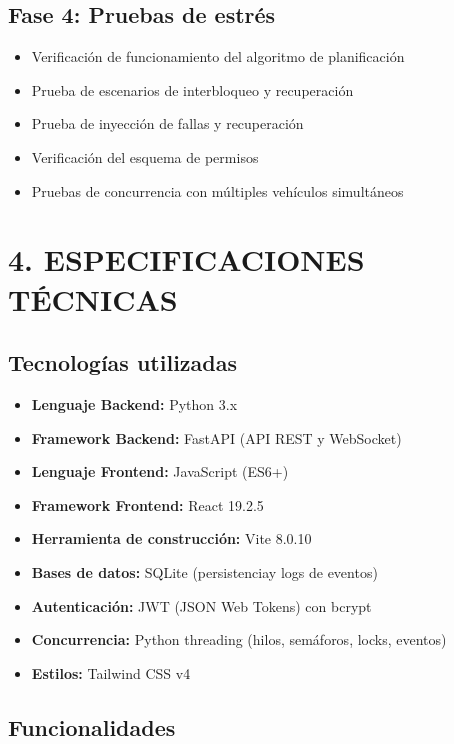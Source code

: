 \documentclass[12pt,a4paper]{article}
\begin{document}
\subsection{Fase 4: Pruebas de estrés}
\begin{itemize}
    \item Verificación de funcionamiento del algoritmo de planificación
    \item Prueba de escenarios de interbloqueo y recuperación
    \item Prueba de inyección de fallas y recuperación
    \item Verificación del esquema de permisos
    \item Pruebas de concurrencia con múltiples vehículos simultáneos
\end{itemize}

\newpage

\section{4. ESPECIFICACIONES TÉCNICAS}

\subsection{Tecnologías utilizadas}

\begin{itemize}
    \item \textbf{Lenguaje Backend:} Python 3.x
    \item \textbf{Framework Backend:} FastAPI (API REST y WebSocket)
    \item \textbf{Lenguaje Frontend:} JavaScript (ES6+)
    \item \textbf{Framework Frontend:} React 19.2.5
    \item \textbf{Herramienta de construcción:} Vite 8.0.10
    \item \textbf{Bases de datos:} SQLite (persistenciay logs de eventos)
    \item \textbf{Autenticación:} JWT (JSON Web Tokens) con bcrypt
    \item \textbf{Concurrencia:} Python threading (hilos, semáforos, locks, eventos)
    \item \textbf{Estilos:} Tailwind CSS v4
\end{itemize}

\subsection{Funcionalidades}
\end{document}
